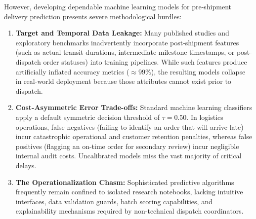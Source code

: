 \documentclass[journal,10pt,twocolumn]{IEEEtran}
\begin{document}
However, developing dependable machine learning models for pre-shipment delivery prediction presents severe methodological hurdles:
\begin{enumerate}
    \item \textbf{Target and Temporal Data Leakage:} Many published studies and exploratory benchmarks inadvertently incorporate post-shipment features (such as actual transit durations, intermediate milestone timestamps, or post-dispatch order statuses) into training pipelines. While such features produce artificially inflated accuracy metrics ($\approx 99\%$), the resulting models collapse in real-world deployment because those attributes cannot exist prior to dispatch.
    \item \textbf{Cost-Asymmetric Error Trade-offs:} Standard machine learning classifiers apply a default symmetric decision threshold of $\tau = 0.50$. In logistics operations, false negatives (failing to identify an order that will arrive late) incur catastrophic operational and customer retention penalties, whereas false positives (flagging an on-time order for secondary review) incur negligible internal audit costs. Uncalibrated models miss the vast majority of critical delays.
    \item \textbf{The Operationalization Chasm:} Sophisticated predictive algorithms frequently remain confined to isolated research notebooks, lacking intuitive interfaces, data validation guards, batch scoring capabilities, and explainability mechanisms required by non-technical dispatch coordinators.
\end{enumerate}
\end{document}
